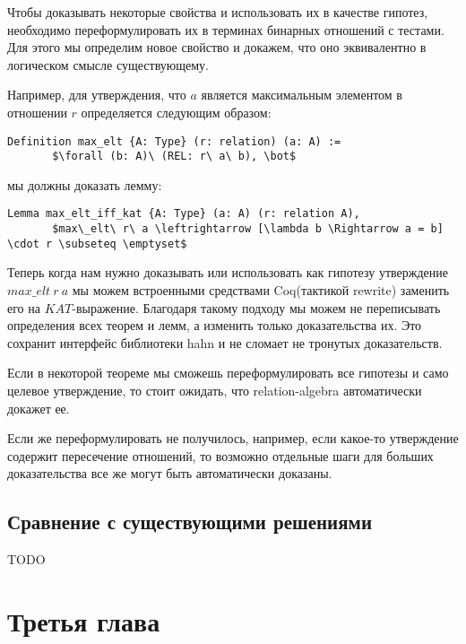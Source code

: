 \documentclass[times
              ]{itmo-student-thesis}
\begin{document}
   Чтобы доказывать некоторые свойства и использовать их в качестве гипотез, необходимо переформулировать их в терминах бинарных отношений с тестами. Для этого мы определим новое свойство и докажем, что оно эквивалентно в логическом смысле существующему.

   Например, для утверждения, что $a$ является максимальным элементом в отношении $r$ определяется следующим образом:
   \begin{lstlisting}[float=!h,caption={Определение max\_elt в hahn},label={lst1},mathescape=true]
     Definition max_elt {A: Type} (r: relation) (a: A) :=
       $\forall (b: A)\ (REL: r\ a\ b), \bot$
   \end{lstlisting}
   мы должны доказать лемму:
   \begin{lstlisting}[mathescape=truem]
     Lemma max_elt_iff_kat {A: Type} (a: A) (r: relation A),
       $max\_elt\ r\ a \leftrightarrow [\lambda b \Rightarrow a = b] \cdot r \subseteq \emptyset$
   \end{lstlisting}

    Теперь когда нам нужно доказывать или использовать как гипотезу утверждение $ max\_elt\ r\ a $
    мы можем встроенными средствами Coq(тактикой rewrite) заменить его на $ KAT $-выражение.
    Благодаря такому подходу мы можем не переписывать определения всех теорем и лемм, а изменить только доказательства их. Это сохранит интерфейс библиотеки hahn и не сломает не тронутых доказательств.


    Если в некоторой теореме мы сможешь переформулировать все гипотезы и само целевое утверждение, то стоит ожидать, что relation-algebra автоматически докажет ее.

    Если же переформулировать не получилось, например, если какое-то утверждение содержит пересечение отношений, то возможно отдельные шаги для больших доказательства все же могут быть автоматически доказаны.

  \section{Сравнение с существующими решениями}
    TODO

\chapter{Третья глава}
\end{document}
